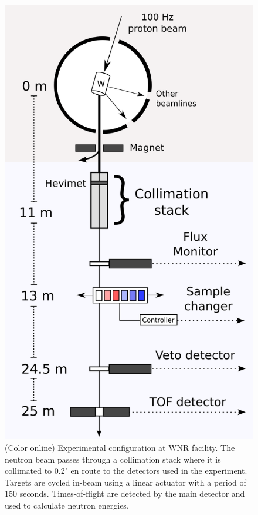 \documentclass[twocolumn,secnumarabic,amssymb, nobibnotes, aps, prl,
superscriptaddress, nobalancelastpage]{revtex4}
\begin{document}
\begin{figure}
    \includegraphics[scale=0.7]{figures/ExperimentalSetup.png}
    \caption{(Color online) Experimental configuration at WNR facility. The
    neutron beam passes through a collimation stack where it is collimated to
    0.2" en route to the detectors used in the experiment. Targets are cycled
    in-beam using a linear actuator with a period of 150 seconds.
    Times-of-flight are detected by the main detector and used to calculate 
    neutron energies.}
    \label{ExperimentalApparatus}
\end{figure}
\end{document}
